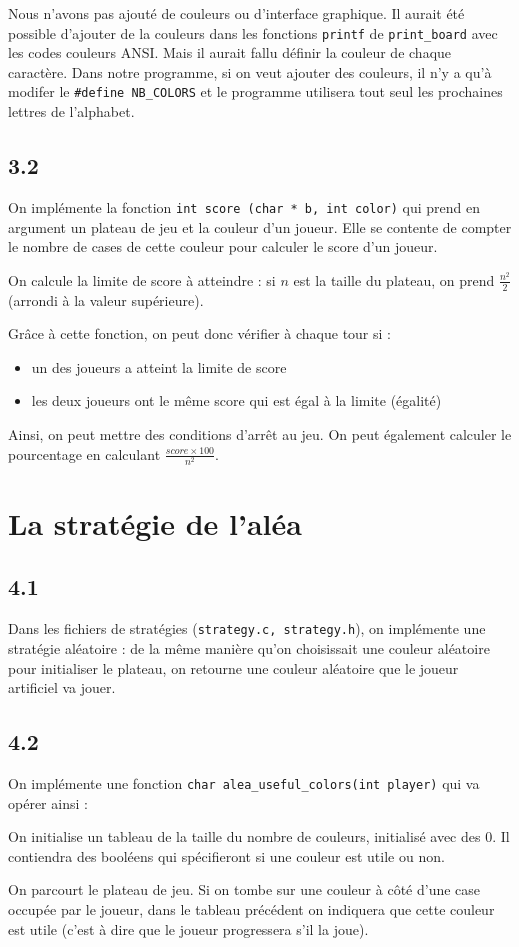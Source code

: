 \documentclass[12pt]{article}
\def\question#1{\subsection{#1}}
\def\sec#1{\section{#1}}
\begin{document}
Nous n'avons pas ajouté de couleurs ou d'interface graphique. Il aurait été possible d'ajouter de la couleurs dans les fonctions \texttt{printf} de \texttt{print\_board} avec les codes couleurs ANSI. Mais il aurait fallu définir la couleur de chaque caractère. Dans notre programme, si on veut ajouter des couleurs, il n'y a qu'à modifer le \texttt{\#define NB\_COLORS} et le programme utilisera tout seul les prochaines lettres de l'alphabet.


\question{3.2}
On implémente la fonction \texttt{int score (char * b, int color)} qui prend en argument un plateau de jeu et la couleur d'un joueur. Elle se contente de compter le nombre de cases de cette couleur pour calculer le score d'un joueur.

On calcule la limite de score à atteindre : si $n$ est la taille du plateau, on prend $\frac{n^2}{2}$ (arrondi à la valeur supérieure).

Grâce à cette fonction, on peut donc vérifier à chaque tour si :
\begin{itemize}
\item un des joueurs a atteint la limite de score
\item les deux joueurs ont le même score qui est égal à la limite (égalité)
\end{itemize}

Ainsi, on peut mettre des conditions d'arrêt au jeu.
On peut également calculer le pourcentage en calculant $\frac{score \times 100}{n^2}$.

\sec{La stratégie de l'aléa}
\question{4.1}
Dans les fichiers de stratégies (\texttt{strategy.c, strategy.h}), on implémente une stratégie aléatoire : de la même manière qu'on choisissait une couleur aléatoire pour initialiser le plateau, on retourne une couleur aléatoire que le joueur artificiel va jouer.

\question{4.2}
On implémente une fonction \texttt{char alea\_useful\_colors(int player)} qui va opérer ainsi :

On initialise un tableau de la taille du nombre de couleurs, initialisé avec des 0. Il contiendra des booléens qui spécifieront si une couleur est utile ou non.

On parcourt le plateau de jeu. Si on tombe sur une couleur à côté d'une case occupée par le joueur, dans le tableau précédent on indiquera que cette couleur est utile (c'est à dire que le joueur progressera s'il la joue).
\end{document}
